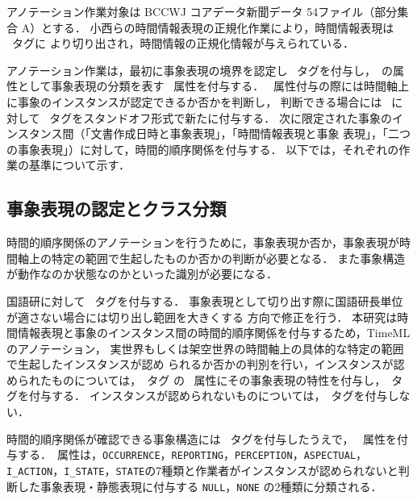 \documentclass[japanese]{jnlp_1.4}
\newcommand{\modified}[1]{}
\def\timexiii{}
\def\event{}
\def\makeinstance{}
\def\klass{}
\begin{document}
アノテーション作業対象は BCCWJ コアデータ新聞データ 54ファイル（部分集合 A）とする．
小西らの時間情報表現の正規化作業により，時間情報表現は \timexiii\ タグに
より切り出され，時間情報の正規化情報が与えられている\cite{小西-2013}．

アノテーション作業は，最初に事象表現の境界を認定し \event\ タグを付与し，\event\ 
の属性として事象表現の分類を表す \klass\ 属性を付与する．
\klass\ 属性付与の際には時間軸上に事象のインスタンスが認定できるか否かを判断し，
判断できる場合には \event\ に対して \makeinstance\ タグをスタンドオフ形式で新たに付与する．
次に限定された事象のインスタンス間（「文書作成日時と事象表現」，「時間情報表現と事象
表現」，「二つの事象表現」）に対して，時間的順序関係を付与する．
以下では，それぞれの作業の基準について示す．


\subsection{事象表現の認定とクラス分類}

時間的順序関係のアノテーションを行うために，\modified{アノテーション対象である動
詞・形容詞・形状詞が}事象表現か否か，事象表現が時間軸上の特定の範囲で生起したものか否かの判断が必要となる．
また事象構造が動作なのか状態なのかといった識別が必要になる．
\modified{また，事象表現間の時間的順序関係を規定するにあたっては，ある事象が他の
事象の項になりうるのか，その場合にどのような事象構造を持つのかを分類する必要があ
る．}

国語研\modified{規程による長単位の動詞・形容詞・形状詞 4,953表現}に対して \event\ タグを付与する．
事象表現として切り出す際に国語研長単位が適さない場合には切り出し範囲を大きくする
方向で修正を行う．
本研究は時間情報表現と事象のインスタンス間の時間的順序関係を付与するため，TimeML のアノテーション\modified{の形式的な基準に基づいて}，
実世界もしくは架空世界の時間軸上の具体的な特定の範囲で生起したインスタンスが認め
られるか否かの判別を行い，インスタンスが認められたものについては，\event\ タグ
の \klass\ 属性にその事象表現の特性を付与し，\makeinstance\ タグを付与する．
インスタンスが認められないものについては，\makeinstance\ タグを付与しない．

時間的順序関係が確認できる事象構造には \makeinstance\ タグを付与したうえで，
\klass\ 属性を付与する．\klass\ 属性は，{\tt OCCURRENCE}，{\tt REPORTING}，{\tt PERCEPTION}，{\tt ASPECTUAL}，
{\tt I\_ACTION}，{\tt I\_STATE}，{\tt STATE}の7種類と作業者がインスタンスが認められないと判断した事象表現・静態表現に付与する {\tt NULL}，{\tt NONE} の2種類に分類される．
\end{document}
